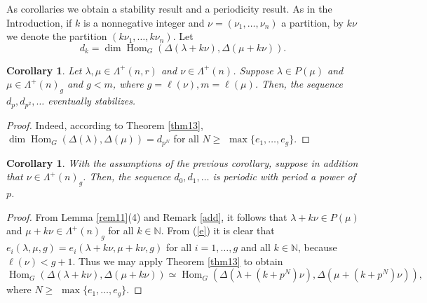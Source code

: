 \documentclass[11pt]{article}
\newtheorem{coro}[theo]{Corollary}
\theoremstyle{definition}
\numberwithin{equation}{section}
\newcommand{\la}{\lambda}
\newcommand{\La}{\Lambda}
\DeclareMathOperator{\Hom}{Hom}
\numberwithin{equation}{section}
\begin{document}
	As corollaries we obtain a stability result and a periodicity result. As in the Introduction, if $k$ is a nonnegative integer and $\nu=(\nu_1,\dots,\nu_n)$ a partition, by $k\nu$ we denote the partition $(k\nu_1,\dots,k\nu_n).$ Let \begin{equation}\label{defdk}d_k=\dim \Hom _{G}(\Delta (\lambda + k \nu), \Delta(\mu + k \nu)).\end{equation}
	
\begin{coro}\label{stab} Let $\la, \mu \in \La^{+}(n,r)$ and $\nu \in \La^{+}(n)$. Suppose $\la \in P(\mu)$ and  $\mu \in \La^{+}(n)_g$ and $g<m$, where $g=\ell(\nu), m=\ell(\mu)$. Then, the sequence $d_{p}, d_{p^2}, \dots$ 
eventually stabilizes.
\end{coro}
\begin{proof} Indeed, according to Theorem \ref{thm13}, $\dim \Hom_{G}(\Delta (\lambda), \Delta(\mu)) = d_{p^N}$ for all $N \ge $ $\max\{e_1,\dots,e_g\}.$
\end{proof}		
\begin{coro}\label{per} With the assumptions of the previous corollary, suppose in addition that $\nu \in \La^{+}(n)_g$. Then, the sequence $d_0, d_1, \dots$ 
	is periodic with period a power of $p$.
\end{coro}
\begin{proof} From Lemma \ref{rem11}(4) and Remark \ref{add}, it follows that $\lambda + k \nu \in P(\mu)$ and $\mu + k \nu \in \Lambda^{+}(n)_g$ for all $k \in \mathbb{N}$. From  (\ref{e}) it is clear that $e_{i}(\lambda, \mu, g) = e_{i}(\lambda + k\nu, \mu + k\nu, g)$ for all $i=1,\dots,g$ and all $k \in \mathbb{N}$, because  $\ell(\nu) < g+1$. Thus we may apply Theorem \ref{thm13} to obtain \[\Hom_{G}(\Delta (\lambda + k \nu), \Delta(\mu + k \nu)) \simeq \Hom_{G}(\Delta (\lambda + (k+p^N) \nu), \Delta(\mu + (k+p^N) \nu)),\] where $N \ge $ $\max\{e_1,\dots,e_g\}.$
\end{proof}		
\end{document}

